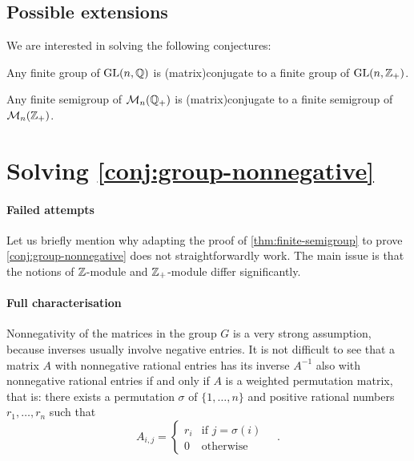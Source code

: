 \subsection{Possible extensions}

We are interested in solving the following conjectures:

\begin{conjecture}
  \label{conj:group-nonnegative}
  Any finite group of $\GL[n]{\Rat}$ is \kl(matrix){conjugate} to a finite group of
  $\GL[n]{\Int_+}$.
\end{conjecture}

\begin{conjecture}
  \label{conj:semigroup-nonnegative}
  Any finite semigroup of $\Mat[n]{\Rat_+}$ is \kl(matrix){conjugate} to a finite semigroup of
  $\Mat[n]{\Int_+}$.
\end{conjecture}

\section{Solving \cref{conj:group-nonnegative}}

\paragraph*{Failed attempts} Let us briefly mention 
why adapting the proof of \cref{thm:finite-semigroup} to
prove \cref{conj:group-nonnegative} does not straightforwardly work.
The main issue is that the notions of $\Int$-module and $\Int_+$-module
differ significantly.


\paragraph*{Full characterisation}
Nonnegativity of the matrices in the group $G$ is a very strong 
assumption, because inverses usually involve negative entries.
It is not difficult to see that a matrix $A$ with nonnegative 
rational entries has its inverse $A^{-1}$ also with nonnegative
rational entries if and only if $A$ is a weighted permutation matrix, 
that is: there exists a permutation $\sigma$ of $\{1, \ldots, n\}$ and
positive rational numbers $r_1, \ldots, r_n$ such that
\begin{equation}
  A_{i,j} = \begin{cases}
    r_i & \text{if } j = \sigma(i) \\
    0 & \text{otherwise}
  \end{cases}
  \quad .
\end{equation}

